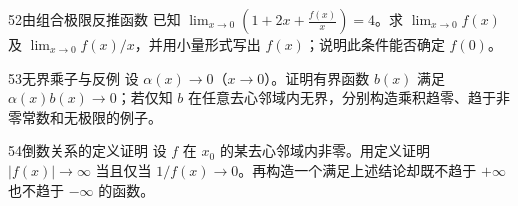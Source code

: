 \begin{exercise}{52}{由组合极限反推函数}
已知 $\lim_{x\to0}\left(1+2x+\frac{f(x)}x\right)=4$。求 $\lim_{x\to0}f(x)$ 及 $\lim_{x\to0}f(x)/x$，并用小量形式写出 $f(x)$；说明此条件能否确定 $f(0)$。
\end{exercise}
\begin{exercise}{53}{无界乘子与反例}
设 $\alpha(x)\to0$（$x\to0$）。证明有界函数 $b(x)$ 满足 $\alpha(x)b(x)\to0$；若仅知 $b$ 在任意去心邻域内无界，分别构造乘积趋零、趋于非零常数和无极限的例子。
\end{exercise}
\begin{exercise}{54}{倒数关系的定义证明}
设 $f$ 在 $x_0$ 的某去心邻域内非零。用定义证明 $|f(x)|\to\infty$ 当且仅当 $1/f(x)\to0$。再构造一个满足上述结论却既不趋于 $+\infty$ 也不趋于 $-\infty$ 的函数。
\end{exercise}
